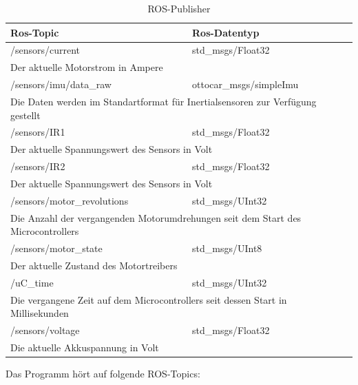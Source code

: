 \begin{table}[H]
  \centering
  \begin{tabularx}{\textwidth}{|l|l|}
    \hline
     Ros-Topic 			& Ros-Datentyp			 \\ \hline \hline	
    /sensors/current		& std\_msgs/Float32														\\ \hline
    \multicolumn{2}{|X|}{Der aktuelle Motorstrom in Ampere}											\\ \hline\hline
    /sensors/imu/data\_raw	& ottocar\_msgs/simpleImu													\\ \hline
    \multicolumn{2}{|X|}{Die Daten werden im Standartformat für Inertialsensoren zur Verfügung gestellt	}						\\ \hline\hline
    /sensors/IR1		& std\_msgs/Float32										\\ \hline
     \multicolumn{2}{|X|}{Der aktuelle Spannungswert des Sensors in Volt}										\\ \hline\hline
    /sensors/IR2		& std\_msgs/Float32										\\ \hline
      \multicolumn{2}{|X|}{Der aktuelle Spannungswert des Sensors in Volt}										\\ \hline\hline
    /sensors/motor\_revolutions	& std\_msgs/UInt32										\\ \hline
      \multicolumn{2}{|X|}{Die Anzahl der vergangenden Motorumdrehungen seit dem Start des Microcontrollers}						\\ \hline\hline
    /sensors/motor\_state	& std\_msgs/UInt8										\\ \hline
      \multicolumn{2}{|X|}{Der aktuelle Zustand des Motortreibers}											\\ \hline\hline
    /uC\_time			& std\_msgs/UInt32										\\ \hline
      \multicolumn{2}{|X|}{Die vergangene Zeit auf dem Microcontrollers seit dessen Start in Millisekunden}						\\ \hline\hline
    /sensors/voltage		& std\_msgs/Float32										\\ \hline
     \multicolumn{2}{|X|}{Die aktuelle Akkuspannung in Volt}												\\ \hline

  \end{tabularx}
  \caption{ROS-Publisher}%
  \label{tab:ros-pub}
\end{table}


Das Programm hört auf folgende ROS-Topics:\\

